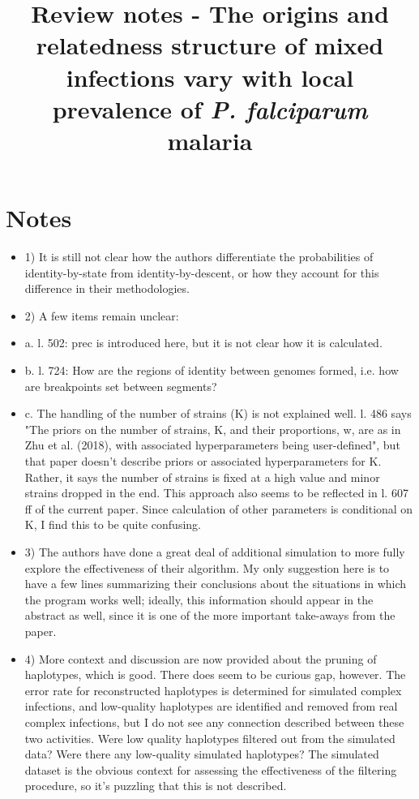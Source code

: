 \documentclass[11pt,twoside,a4paper]{article}
\begin{document}
\title{Review notes - The origins and relatedness structure of mixed infections vary with local prevalence of {\it P. falciparum} malaria}
\newcommand\shorttitle{Review}
\date{}
\maketitle{}
\section{Notes}

\begin{itemize}

    \item 1) It is still not clear how the authors differentiate the probabilities of identity-by-state from identity-by-descent, or how they account for this difference in their methodologies.

    \item 2) A few items remain unclear:

    \item a. l. 502: prec is introduced here, but it is not clear how it is calculated.

    \item b. l. 724: How are the regions of identity between genomes formed, i.e. how are breakpoints set between segments?

    \item c. The handling of the number of strains (K) is not explained well. l. 486 says "The priors on the number of strains, K, and their proportions, w, are as in Zhu et al. (2018), with associated hyperparameters being user-defined", but that paper doesn't describe priors or associated hyperparameters for K. Rather, it says the number of strains is fixed at a high value and minor strains dropped in the end. This approach also seems to be reflected in l. 607 ff of the current paper. Since calculation of other parameters is conditional on K, I find this to be quite confusing.

    \item 3) The authors have done a great deal of additional simulation to more fully explore the effectiveness of their algorithm. My only suggestion here is to have a few lines summarizing their conclusions about the situations in which the program works well; ideally, this information should appear in the abstract as well, since it is one of the more important take-aways from the paper.

    \item 4) More context and discussion are now provided about the pruning of haplotypes, which is good. There does seem to be curious gap, however. The error rate for reconstructed haplotypes is determined for simulated complex infections, and low-quality haplotypes are identified and removed from real complex infections, but I do not see any connection described between these two activities. Were low quality haplotypes filtered out from the simulated data? Were there any low-quality simulated haplotypes? The simulated dataset is the obvious context for assessing the effectiveness of the filtering procedure, so it's puzzling that this is not described.


\end{itemize}
\end{document}
